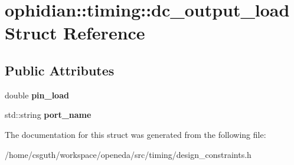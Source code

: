\hypertarget{structophidian_1_1timing_1_1dc__output__load}{\section{ophidian\-:\-:timing\-:\-:dc\-\_\-output\-\_\-load Struct Reference}
\label{structophidian_1_1timing_1_1dc__output__load}
}
\subsection*{Public Attributes}
\begin{DoxyCompactItemize}
\item 
\hypertarget{structophidian_1_1timing_1_1dc__output__load_a4ecf6f82a611e6577bf53e694d968f3e}{double {\bfseries pin\-\_\-load}}\label{structophidian_1_1timing_1_1dc__output__load_a4ecf6f82a611e6577bf53e694d968f3e}

\item 
\hypertarget{structophidian_1_1timing_1_1dc__output__load_a499d3177b16b496b080d994d710944e9}{std\-::string {\bfseries port\-\_\-name}}\label{structophidian_1_1timing_1_1dc__output__load_a499d3177b16b496b080d994d710944e9}

\end{DoxyCompactItemize}


The documentation for this struct was generated from the following file\-:\begin{DoxyCompactItemize}
\item 
/home/csguth/workspace/openeda/src/timing/design\-\_\-constraints.\-h\end{DoxyCompactItemize}
